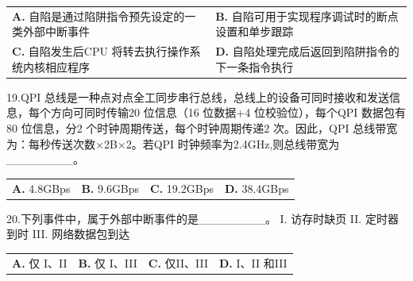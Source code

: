 \documentclass[UTF8,11pt]{ctexart}
\begin{document}
\begin{center}\begin{tabular}{>{\raggedright\arraybackslash}p{\dimexpr(\linewidth-4\tabcolsep)/2\relax}>{\raggedright\arraybackslash}p{\dimexpr(\linewidth-4\tabcolsep)/2\relax}}
\textbf{A.} 自陷是通过陷阱指令预先设定的一类外部中断事件 & \textbf{B.} 自陷可用于实现程序调试时的断点设置和单步跟踪\\[.35em]
\textbf{C.} 自陷发生后CPU 将转去执行操作系统内核相应程序 & \textbf{D.} 自陷处理完成后返回到陷阱指令的下一条指令执行\\[.35em]\end{tabular}\end{center}

19.QPI 总线是一种点对点全工同步串行总线，总线上的设备可同时接收和发送信息，每个方向可同时传输20 位信息（16 位数据+4 位校验位），每个QPI 数据包有80 位信息，分2 个时钟周期传送，每个时钟周期传递2 次。因此，QPI 总线带宽为：每秒传送次数×2B×2。若QPI 时钟频率为2.4GHz,则总线带宽为\_\_\_\_\_\_\_\_。


\begin{center}\begin{tabular}{>{\raggedright\arraybackslash}p{\dimexpr(\linewidth-8\tabcolsep)/4\relax}>{\raggedright\arraybackslash}p{\dimexpr(\linewidth-8\tabcolsep)/4\relax}>{\raggedright\arraybackslash}p{\dimexpr(\linewidth-8\tabcolsep)/4\relax}>{\raggedright\arraybackslash}p{\dimexpr(\linewidth-8\tabcolsep)/4\relax}}
\textbf{A.} 4.\allowbreak{}8GBps & \textbf{B.} 9.\allowbreak{}6GBps & \textbf{C.} 19.\allowbreak{}2GBps & \textbf{D.} 38.\allowbreak{}4GBps\\[.35em]\end{tabular}\end{center}

20.下列事件中，属于外部中断事件的是\_\_\_\_\_\_\_\_。 I. 访存时缺页 II. 定时器到时 III. 网络数据包到达


\begin{center}\begin{tabular}{>{\raggedright\arraybackslash}p{\dimexpr(\linewidth-8\tabcolsep)/4\relax}>{\raggedright\arraybackslash}p{\dimexpr(\linewidth-8\tabcolsep)/4\relax}>{\raggedright\arraybackslash}p{\dimexpr(\linewidth-8\tabcolsep)/4\relax}>{\raggedright\arraybackslash}p{\dimexpr(\linewidth-8\tabcolsep)/4\relax}}
\textbf{A.} 仅 I、II & \textbf{B.} 仅 I、III & \textbf{C.} 仅II、III & \textbf{D.} I、II 和III\\[.35em]\end{tabular}\end{center}
\end{document}
